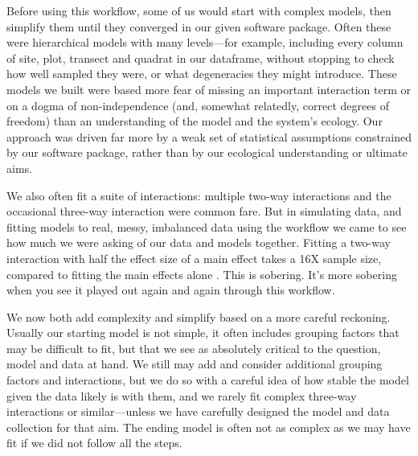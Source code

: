 \documentclass[11pt]{article}
\begin{document}
{%
Before using this workflow, some of us would start with complex models, then simplify them until they converged in our given software package. Often these were hierarchical models with many levels---for example, including every column of site, plot, transect and quadrat in our dataframe, without stopping to check how well sampled they were, or what degeneracies they might introduce. These models we built were based more fear of missing an important interaction term or on a dogma of non-independence (and, somewhat relatedly, correct degrees of freedom) than an understanding of the model and the system's ecology. Our approach was driven far more by a weak set of statistical assumptions constrained by our software package, rather than by our ecological understanding or ultimate aims. 

We also often fit a suite of interactions: multiple two-way interactions and the occasional three-way interaction were common fare. But in simulating data, and fitting models to real, messy, imbalanced data using the workflow we came to see how much we were asking of our data and models together. Fitting a two-way interaction with half the effect size of a main effect takes a 16X sample size, compared to fitting the main effects alone \citep[the main effects then average over the interactions, see][for more details]{regotherstories}. This is sobering. It's more sobering when you see it played out again and again through this workflow. 

We now both add complexity and simplify based on a more careful reckoning. Usually our starting model is not simple, it often includes grouping factors that may be difficult to fit, but that we see as absolutely critical to the question, model and data at hand. We still may add and consider additional grouping factors and interactions, but we do so with a careful idea of how stable the model given the data likely is with them, and we rarely fit complex three-way interactions or similar---unless we have carefully designed the model and data collection for that aim. The ending model is often not as complex as we may have fit if we did not follow all the steps. 

}
\end{document}
